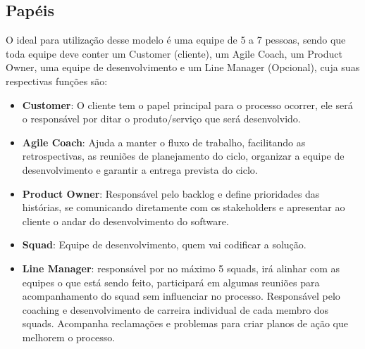 \documentclass[	DIV=calc,%
							paper=a4,%
							fontsize=12pt,%
							onecolumn]{scrartcl}	 					%
\begin{document}
\subsection{Papéis}
O ideal para utilização desse modelo é uma equipe de 5 a 7 pessoas, sendo que toda equipe deve conter um Customer (cliente), um Agile Coach, um Product Owner, uma equipe de desenvolvimento e um Line Manager (Opcional), cuja suas respectivas funções são: 
\begin{itemize}
	\item \textbf{Customer}: O cliente tem o papel principal para o processo ocorrer, ele será o responsável por ditar o produto/serviço que será desenvolvido.
	\item \textbf{Agile Coach}: Ajuda a manter o fluxo de trabalho, facilitando as retrospectivas, as reuniões de planejamento do ciclo, organizar a equipe de desenvolvimento e garantir a entrega prevista do ciclo. 
	
	\item \textbf{Product Owner}:\cite{scrumguide} Responsável pelo backlog e define prioridades das histórias, se comunicando diretamente com os stakeholders e apresentar ao cliente o andar do desenvolvimento do software. 
	
	\item \textbf{Squad}: Equipe de desenvolvimento, quem vai codificar a solução.
	
	\item \textbf{Line Manager}: responsável por no máximo 5 squads, irá alinhar com as equipes o que está sendo feito, participará em algumas reuniões para acompanhamento do squad sem influenciar no processo. Responsável pelo coaching e desenvolvimento de carreira individual de cada membro dos squads. Acompanha reclamações e problemas para criar planos de ação que melhorem o processo. 
\end{itemize}
\end{document}
